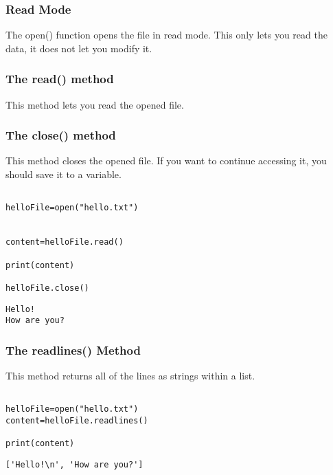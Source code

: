 \documentclass[11pt]{article}
\begin{document}
\subsubsection{Read Mode}
\label{sec:orgba5ee06}

The open() function opens the file in read mode. This only lets you read the data, it does not let you modify it.

\subsubsection{The read() method}
\label{sec:org79f3b9b}

This method lets you read the opened file.

\subsubsection{The close() method}
\label{sec:org84a6bd5}

This method closes the opened file. If you want to continue accessing it, you should save it to a variable.

\begin{verbatim}

helloFile=open("hello.txt")


content=helloFile.read()

print(content)

helloFile.close()

\end{verbatim}

\begin{verbatim}
Hello!
How are you?
\end{verbatim}

\subsubsection{The readlines() Method}
\label{sec:org7608051}

This method returns all of the lines as strings within a list.

\begin{verbatim}

helloFile=open("hello.txt")
content=helloFile.readlines()

print(content)

\end{verbatim}

\begin{verbatim}
['Hello!\n', 'How are you?']
\end{verbatim}
\end{document}
